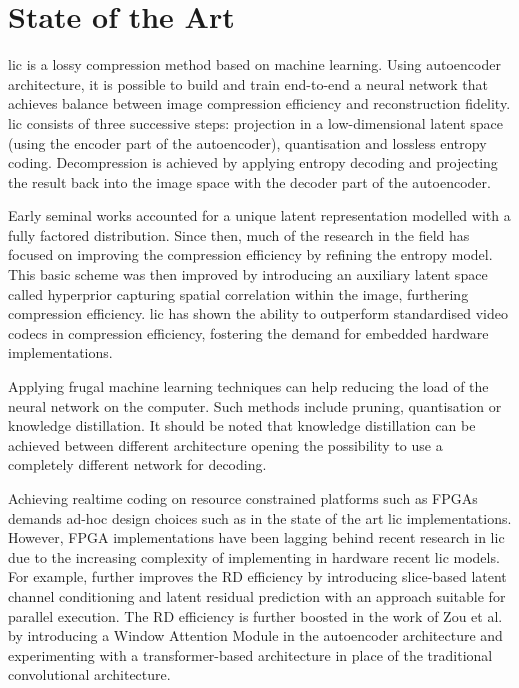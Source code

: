 \chapter{State of the Art}
\label{sota}
\acrfull{lic} is a lossy compression method based on machine learning. Using autoencoder architecture, it is possible to build and train end-to-end a neural network that achieves balance between image compression efficiency and reconstruction fidelity. \acrshort{lic} consists of three successive steps: projection in a low-dimensional latent space (using the encoder part of the autoencoder), quantisation and lossless entropy coding. Decompression is achieved by applying entropy decoding and projecting the result back into the image space with the decoder part of the autoencoder. \cite{licmedium, licstanford}

Early seminal works accounted for a unique latent representation modelled with a fully factored distribution.\cite{ballé2017endtoendoptimizedimagecompression} Since then, much of the research in the field has focused on improving the compression efficiency by refining the entropy model. This basic scheme was then improved by introducing an auxiliary latent space called hyperprior capturing spatial correlation within the image, furthering compression efficiency.\cite{ballé2018variationalimagecompressionscale} \acrshort{lic} has shown the ability to outperform standardised video codecs in compression efficiency, fostering the demand for embedded hardware implementations.

Applying frugal machine learning techniques can help reducing the load of the neural network on the computer. Such methods include pruning, quantisation or knowledge distillation.\cite{touvron2021trainingdataefficientimagetransformers} It should be noted that knowledge distillation can be achieved between different architecture opening the possibility to use a completely different network for decoding.\cite{liu2022crossarchitectureknowledgedistillation}

Achieving realtime coding on resource constrained platforms such as FPGAs demands ad-hoc design choices
such as in the state of the art \acrshort{lic} implementations. However, FPGA implementations have
been lagging behind recent research in \acrshort{lic} due to the increasing complexity of implementing in hardware recent \acrshort{lic} models. For example, further improves the RD efficiency by introducing s\acrshort{lic}e-based latent channel conditioning and latent residual prediction with an approach suitable for parallel execution. The RD efficiency is further boosted in the work of Zou et al.\cite{zou2022devildetailswindowbasedattention} by introducing a Window Attention Module in the autoencoder architecture and experimenting with a transformer-based architecture in place of the traditional convolutional architecture.